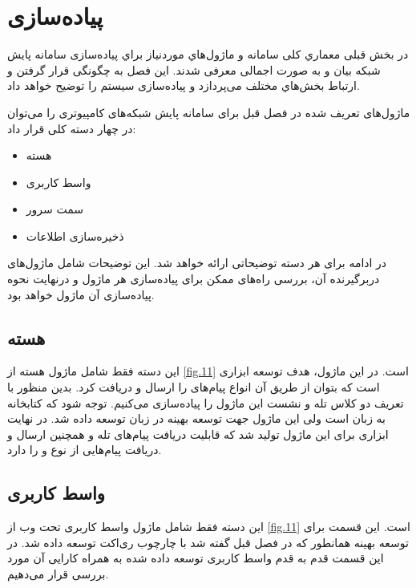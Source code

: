 \chapter{پیاده‌سازی}

در بخش قبلی معماري کلی سامانه و ماژول‌هاي موردنیاز براي پیاده‌سازی سامانه پایش شبکه بیان و به صورت اجمالی معرفی شدند. این فصل به چگونگی قرار گرفتن و ارتباط بخش‌هاي مختلف می‌پردازد و پیاده‌سازی سیستم را توضیح خواهد داد.


ماژول‌های تعریف شده در فصل قبل برای سامانه پایش شبکه‌های کامپیوتری را می‌توان در چهار دسته کلی قرار داد: 

\begin{itemize}
    \item هسته 
    \item واسط کاربری 
    \item سمت سرور
    \item ذخیره‌سازی اطلاعات


\end{itemize}

در ادامه برای هر دسته توضیحاتی ارائه خواهد شد. این توضیحات شامل ماژول‌های دربرگیرنده آن، بررسی راه‌های ممکن برای پیاده‌سازی هر ماژول و درنهایت نحوه پیاده‌سازی آن ماژول خواهد بود. 


\section{هسته }

این دسته فقط شامل ماژول هسته  از \cref{fig.11} است. در این ماژول، هدف توسعه ابزاری است که بتوان از طریق آن انواع پیام‌های  را ارسال و دریافت کرد. بدین منظور با تعریف دو کلاس تله و نشست این ماژول را پیاده‌سازی می‌کنیم. توجه شود که کتابخانه  به زبان  است ولی این ماژول جهت توسعه بهینه در زبان  توسعه داده شد. در نهایت ابزاری برای این ماژول تولید شد که قابلیت دریافت پیام‌های تله و همچنین ارسال و دریافت پیام‌هایی از نوع   و  را دارد.

\newpage

\section{واسط کاربری}

این دسته فقط شامل ماژول واسط کاربری تحت وب از \cref{fig.11} است. این قسمت برای توسعه بهینه همانطور که در فصل قبل گفته شد با چارچوب ری‌اکت توسعه داده شد. در این قسمت قدم به قدم واسط کاربری توسعه داده شده به همراه کارایی آن مورد بررسی قرار می‌دهیم.


